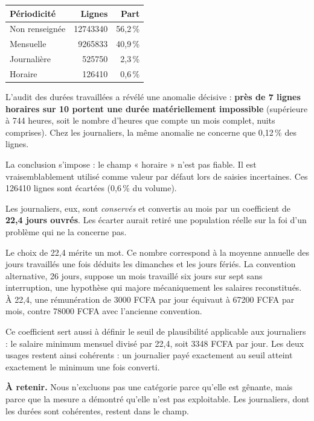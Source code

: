\documentclass[11pt,a4paper]{article}
\begin{document}
\begin{center}
\begin{tabular}{lrr}
\toprule
\textbf{Périodicité} & \textbf{Lignes} & \textbf{Part} \\
\midrule
Non renseignée & \num{12743340} & 56,2\,\% \\
Mensuelle & \num{9265833} & 40,9\,\% \\
Journalière & \num{525750} & 2,3\,\% \\
Horaire & \num{126410} & 0,6\,\% \\
\bottomrule
\end{tabular}
\end{center}

L'audit des durées travaillées a révélé une anomalie décisive :
\textbf{près de 7 lignes horaires sur 10 portent une durée
matériellement impossible} (supérieure à 744 heures, soit le nombre
d'heures que compte un mois complet, nuits comprises). Chez les
journaliers, la même anomalie ne concerne que 0,12\,\% des lignes.

La conclusion s'impose : le champ « horaire » n'est pas fiable. Il est
vraisemblablement utilisé comme valeur par défaut lors de saisies
incertaines. Ces \num{126410} lignes sont écartées (0,6\,\% du volume).

Les journaliers, eux, sont \emph{conservés} et convertis au mois par un
coefficient de \textbf{22,4 jours ouvrés}. Les écarter aurait retiré une
population réelle sur la foi d'un problème qui ne la concerne pas.

Le choix de 22,4 mérite un mot. Ce nombre correspond à la moyenne annuelle
des jours travaillés une fois déduits les dimanches et les jours fériés.
La convention alternative, 26 jours, suppose un mois travaillé six jours
sur sept sans interruption, une hypothèse qui majore mécaniquement les
salaires reconstitués. À 22,4, une rémunération de \num{3000} FCFA par jour
équivaut à \num{67200} FCFA par mois, contre \num{78000} FCFA avec
l'ancienne convention.

Ce coefficient sert aussi à définir le seuil de plausibilité applicable aux
journaliers : le salaire minimum mensuel divisé par 22,4, soit
\num{3348} FCFA par jour. Les deux usages restent ainsi cohérents : un
journalier payé exactement au seuil atteint exactement le minimum une fois
converti.

\begin{retenir}
\textbf{À retenir.} Nous n'excluons pas une catégorie parce qu'elle est
gênante, mais parce que la mesure a démontré qu'elle n'est pas
exploitable. Les journaliers, dont les durées sont cohérentes, restent
dans le champ.
\end{retenir}
\end{document}
